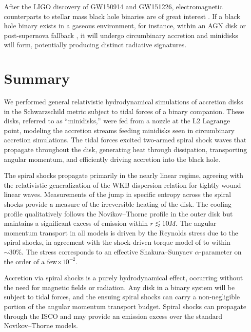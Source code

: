 \documentclass{emulateapj}
\newcommand{\al}{\alpha}
\begin{document}
After the LIGO discovery of GW150914 and GW151226, electromagnetic counterparts to stellar mass black hole binaries are of great interest \citep{LIGO16GW150914Discovery, LIGO16GW151226}.  If a black hole binary exists in a gaseous environment, for instance, within an AGN disk \citep{Bartos16, Stone17} or post-supernova fallback \citep{Perna16}, it will undergo circumbinary accretion and minidisks will form, potentially producing distinct radiative signatures.  



\section{Summary}
\label{sec:summary}


We performed general relativistic hydrodynamical simulations of accretion disks in the Schwarzschild metric subject to tidal forces of a binary companion.  These disks, referred to as ``minidisks,'' were fed from a nozzle at the L2 Lagrange point, modeling the accretion streams feeding minidisks seen in circumbinary accretion simulations.  The tidal forces excited two-armed spiral shock waves that propagate throughout the disk,  generating heat through dissipation, transporting angular momentum, and efficiently driving accretion into the black hole.

The spiral shocks propagate primarily in the nearly linear regime, agreeing with the relativistic generalization of the WKB dispersion relation for tightly wound linear waves.  Measurements of the jump in specific entropy across the spiral shocks provide a measure of the irreversible heating of the disk.  The cooling profile qualitatively follows the Novikov--Thorne profile in the outer disk but maintains a significant excess of emission within $r \lesssim 10 M$.  The angular momentum transport in all models is driven by the Reynolds stress due to the spiral shocks, in agreement with the shock-driven torque model of \cite{Rafikov16} to within $\sim30\%$.  The stress corresponds to an effective Shakura--Sunyaev $\al$-parameter on the order of a few$\times 10^{-2}$.

Accretion via spiral shocks is a purely hydrodynamical effect, occurring without the need for magnetic fields or radiation.  Any disk in a binary system will be subject to tidal forces, and the ensuing spiral shocks can carry a non-negligible portion of the angular momentum transport budget.  Spiral shocks can propagate through the ISCO and may provide an emission excess over the standard Novikov--Thorne models.
\end{document}
